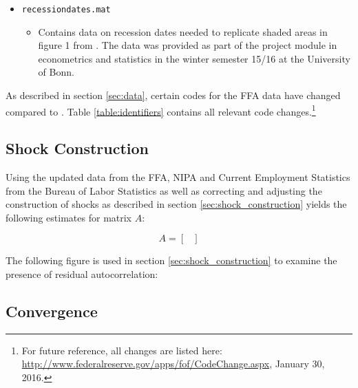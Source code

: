 \begin{itemize}
\item \texttt{recessiondates.mat}
	\begin{itemize}
		\item Contains data on recession dates needed to replicate shaded areas in figure 1 from \cite{JERMANNfinancial}. The data was provided as part of the project module in econometrics and statistics in the winter semester 15/16 at the University of Bonn.
	\end{itemize}

\end{itemize}

As described in section \ref{sec:data}, certain codes for the FFA data have changed compared to \citeauthor{JERMANNfinancial}. Table \ref{table:identifiers} contains all relevant code changes.\footnote{For future reference, all changes are listed here: \href{http://www.federalreserve.gov/apps/fof/CodeChange.aspx}{http://www.federalreserve.gov/apps/fof/CodeChange.aspx}, January 30, 2016.} 




\subsection{Shock Construction}
\label{sec:appendix_shock_construction}

Using the updated data from the FFA, NIPA and Current Employment Statistics from the Bureau of Labor Statistics as well as correcting and adjusting the construction of shocks as described in section \ref{sec:shock_construction} yields the following estimates for matrix $A$:
\begin{center}
\[
    A=
      \begin{bmatrix}
    	
      \end{bmatrix}
\]
\end{center}

The following figure is used in section \ref{sec:shock_construction} to examine the presence of residual autocorrelation:




\subsection{Convergence}
\label{sec:appendix_convergence}



